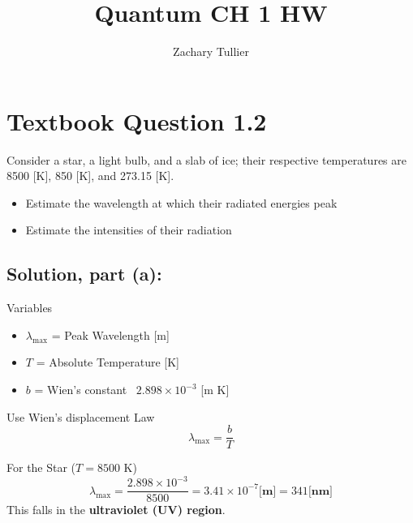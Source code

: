 \documentclass[12pt]{article}
\begin{document}
\singlespacing  %
\title{Quantum CH 1 HW}

\author[1]{Zachary Tullier}
\date{}
\maketitle

\section{Textbook Question 1.2}
    Consider a star, a light bulb, and a slab of ice; their respective temperatures are 8500 [K], 850 [K], and 273.15 [K].
    \begin{itemize}
        \item [(a)] Estimate the wavelength at which their radiated energies peak
        \item [(b)] Estimate the intensities of their radiation
    \end{itemize}

    \subsection{Solution, part (a):}
        Variables
        \begin{itemize}
            \item $\lambda_{\text{max}}$ = Peak Wavelength [m]
            \item $T$ = Absolute Temperature [K]
            \item $b$ = Wien’s constant ~$2.898 \times 10^{-3}$ [m K]
        \end{itemize}

        Use Wien's displacement Law
        \begin{equation}
            \lambda_{\text{max}} = \frac{b}{T}
        \end{equation}

        For the Star ($T = 8500$ K)
        \begin{equation}
            \lambda_{\text{max}} = \frac{2.898 \times 10^{-3}}{8500} = 3.41 \times 10^{-7} \textbf{[m]} = 341 \textbf{[nm]}
        \end{equation}
        This falls in the \textbf{ultraviolet (UV) region}.
        
\end{document}
